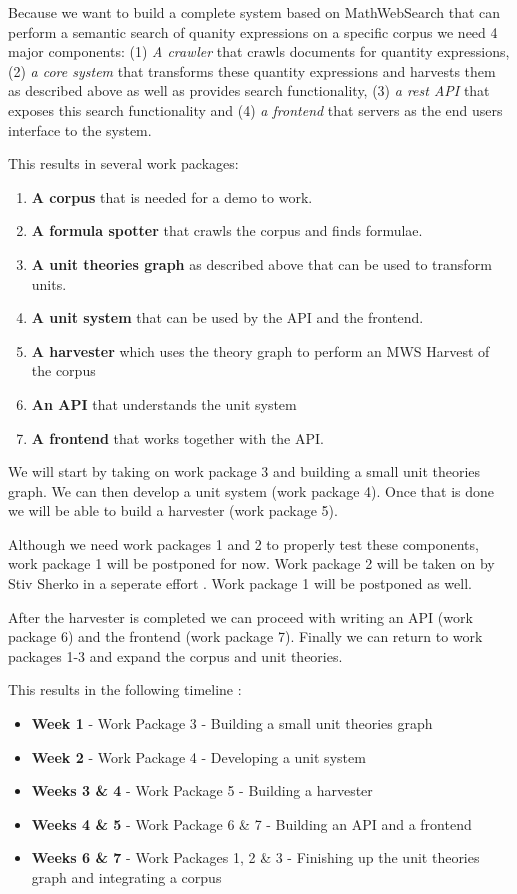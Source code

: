 \documentclass[11pt]{article}
\begin{document}
Because we want to build a complete system based on MathWebSearch that can perform a semantic search of quanity expressions on a specific corpus we need 4 major components: (1) \textit{A crawler} that crawls documents for quantity expressions, (2) \textit{a core system} that transforms these quantity expressions and harvests them as described above as well as provides search functionality, (3) \textit{a rest API} that exposes this search functionality and (4) \textit{a frontend} that servers as the end users interface to the system.

This results in several work packages:

\begin{enumerate}
  \item \textbf{A corpus} that is needed for a demo to work.
  \item \textbf{A formula spotter} that crawls the corpus and finds formulae.
  \item \textbf{A unit theories graph} as described above that can be used to transform units.
  \item \textbf{A unit system} that can be used by the API and the frontend.
  \item \textbf{A harvester} which uses the theory graph to perform an MWS Harvest of the corpus
  \item \textbf{An API} that understands the unit system
  \item \textbf{A frontend} that works together with the API.
\end{enumerate}

We will start by taking on work package 3 and building a small unit theories graph. We can then develop a unit system (work package 4). Once that is done we will be able to build a harvester (work package 5).

Although we need work packages 1 and 2 to properly test these components, work package 1 will be postponed for now. Work package 2 will be taken on by Stiv Sherko in a seperate effort \cite{proposal:sharko}. Work package 1 will be postponed as well.

After the harvester is completed we can proceed with writing an API (work package 6) and the frontend (work package 7). Finally we can return to work packages 1-3 and expand the corpus and unit theories.

This results in the following timeline :
\begin{itemize}
  \item \textbf{Week 1} - Work Package 3 - Building a small unit theories graph
  \item \textbf{Week 2} - Work Package 4 - Developing a unit system
  \item \textbf{Weeks 3 \& 4} - Work Package 5 - Building a harvester
  \item \textbf{Weeks 4 \& 5} - Work Package 6 \& 7 - Building an API and a frontend
  \item \textbf{Weeks 6 \& 7} - Work Packages 1, 2 \& 3 - Finishing up the unit theories graph and integrating a corpus
\end{itemize}
\end{document}
